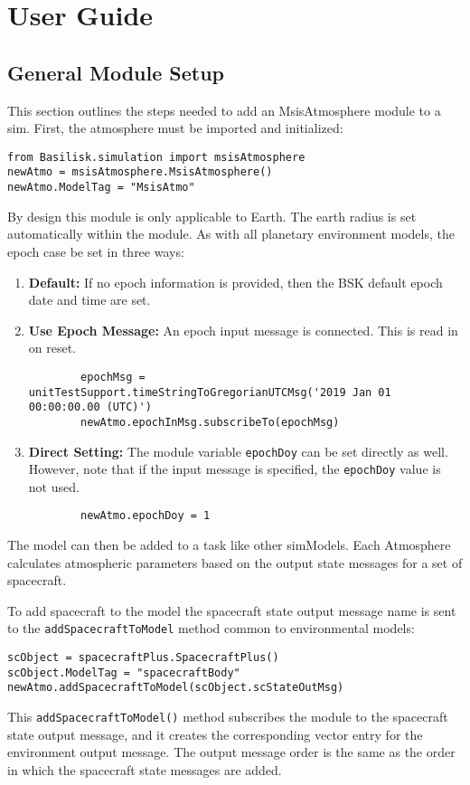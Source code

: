 
\section{User Guide}

\subsection{General Module Setup}
This section outlines the steps needed to add an MsisAtmosphere module to a sim.
First, the atmosphere must be imported and initialized:
\begin{verbatim}
from Basilisk.simulation import msisAtmosphere
newAtmo = msisAtmosphere.MsisAtmosphere()
newAtmo.ModelTag = "MsisAtmo"
\end{verbatim}

By design this module is only applicable to Earth.  The earth radius is set automatically within the module.  As with all planetary environment models, the epoch case be set in three ways:
\begin{enumerate}
	\item  {\bfseries Default:} If no epoch information is provided, then the BSK default epoch date and time are set.
	\item  {\bfseries Use Epoch Message:}  An epoch input message  is connected.  This is read in on reset.
	\begin{verbatim}
		epochMsg = unitTestSupport.timeStringToGregorianUTCMsg('2019 Jan 01 00:00:00.00 (UTC)')
		newAtmo.epochInMsg.subscribeTo(epochMsg)
	\end{verbatim}
	\item  {\bfseries Direct Setting:} The module variable {\tt epochDoy} can be set directly as well.  However, note that if the input message is specified, the {\tt epochDoy} value is not used.
	\begin{verbatim}
		newAtmo.epochDoy = 1
	\end{verbatim}	
\end{enumerate}

The model can then be added to a task like other simModels. Each Atmosphere calculates atmospheric parameters based on the output state messages for a set of spacecraft.

To add spacecraft to the model the spacecraft state output message name is sent to the \verb|addSpacecraftToModel| method common to environmental models:
\begin{verbatim}
scObject = spacecraftPlus.SpacecraftPlus()
scObject.ModelTag = "spacecraftBody"
newAtmo.addSpacecraftToModel(scObject.scStateOutMsg)
\end{verbatim}
This {\tt addSpacecraftToModel()} method subscribes the module to the spacecraft state output message, and it creates the  corresponding vector entry for the environment output message.  The output message order is the same as the order in which the spacecraft state messages are added.

